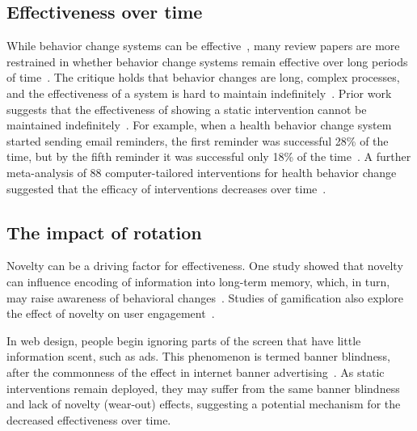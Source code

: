 \subsection{Effectiveness over time}
While behavior change systems can be effective~\cite{doi:10.1080/15228830802094429, Cuijpers2008, info:doi/10.2196/jmir.1376}, many review papers are more restrained in whether behavior change systems remain effective over long periods of time~\cite{doi:10.1111/j.1467-789X.2009.00646.x, 10.1371/journal.pmed.1000387, NORMAN2007336, 10.1007/978-3-319-07127-5_11}. The critique holds that behavior changes are long, complex processes, and the effectiveness of a system is hard to maintain indefinitely~\cite{prochaska1997transtheoretical}. Prior work suggests that the effectiveness of showing a static intervention cannot be maintained indefinitely~\cite{Hiniker:2016:MDE:2858036.2858403, riekert2013handbook}. For example, when a health behavior change system started sending email reminders, the first reminder was successful 28\% of the time, but by the fifth reminder it was successful only 18\% of the time~\cite{kaptein2015personalizing}. A further meta-analysis of 88 computer-tailored interventions for health behavior change suggested that the efficacy of interventions decreases over time~\cite{krebs2010meta}. %


\subsection{The impact of rotation}
Novelty can be a driving factor for effectiveness. %
One study showed that novelty can influence encoding of information into long-term memory, which, in turn, may raise awareness of behavioral changes~\cite{doi:10.1111/j.1467-9450.2005.00443.x}. Studies of gamification also explore the effect of novelty on user engagement~\cite{6758978}.  %

In web design, people begin ignoring parts of the screen that have little information scent, such as ads. This phenomenon is termed banner blindness, after the commonness of the effect in internet banner advertising~\cite{benway1998banner}. As static interventions remain deployed, they may suffer from the same banner blindness and lack of novelty (wear-out) effects, suggesting a potential mechanism for the decreased effectiveness over time.

